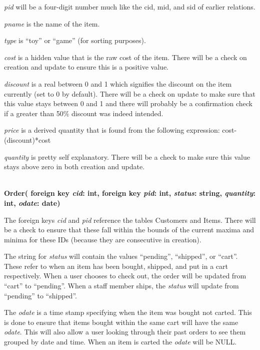 \documentclass[letterpaper]{article}
\begin{document}
\begin{adjustwidth}{1.5cm}{}
\textit{pid} will be a four-digit number much like the cid, mid, and sid of earlier relations.

\textit{pname} is the name of the item.

\textit{type} is “toy” or “game” (for sorting purposes).

\textit{cost} is a hidden value that is the raw cost of the item.  There will be a check on creation and update to ensure this is a positive value.

\textit{discount} is a real between 0 and 1 which signifies the discount on the item currently (set to 0 by default).  There will be a check on update to make sure that this value stays between 0 and 1 and there will probably be a confirmation check if a greater than 50\% discount was indeed intended.

\textit{price} is a derived quantity that is found from the following expression: cost-(discount)*cost

\textit{quantity} is pretty self explanatory.  There will be a check to make sure this value stays above zero in both creation and update.
\end{adjustwidth}\*\\
\textbf{Order( foreign key \textit{cid}: int, foreign key \textit{pid}: int, \textit{status}: string, \textit{quantity}: int, \textit{odate}: date)}
\begin{adjustwidth}{1.5cm}{}
The foreign keys \textit{cid} and \textit{pid} reference the tables Customers and Items.  There will be a check to ensure that these fall within the bounds of the current maxima and minima for these IDs (because they are consecutive in creation).

The string for \textit{status} will contain the values “pending”, “shipped”, or “cart”.  These refer to when an item has been bought, shipped, and put in a cart respectively.  When a user chooses to check out, the order will be updated from “cart” to “pending”.  When a staff member ships, the \textit{status} will update from “pending” to “shipped”.

The \textit{odate} is a time stamp specifying when the item was bought not carted.  This is done to ensure that items bought within the same cart will have the same \textit{odate}. This will also allow a user looking through their past orders to see them grouped by date and time.  When an item is carted the \textit{odate} will be NULL.
\end{adjustwidth}
\end{document}
